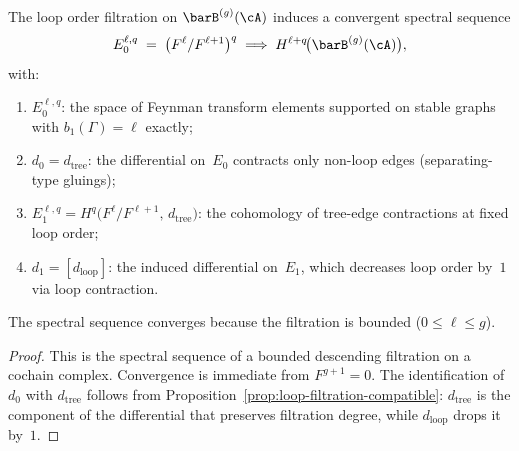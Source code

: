 \begin{theorem}\label{thm:loop-order-spectral-sequence}
The loop order filtration on $\barB^{(g)}(\cA)$ induces a
convergent spectral sequence
\begin{equation}\label{eq:loop-ss}
E_0^{\ell,q}
\;=\;
\bigl(F^\ell / F^{\ell+1}\bigr)^q
\;\Longrightarrow\;
H^{\ell+q}\!\bigl(\barB^{(g)}(\cA)\bigr),
\end{equation}
with:
\begin{enumerate}[label=\textup{(\roman*)}]
\item $E_0^{\ell,q}$: the space of Feynman transform elements
 supported on stable graphs with $b_1(\Gamma) = \ell$ exactly;

\item $d_0 = d_{\mathrm{tree}}$: the differential on~$E_0$ contracts
 only non-loop edges \textup{(}separating-type gluings\textup{)};

\item $E_1^{\ell,q}
 = H^q\!\bigl(F^\ell / F^{\ell+1},\, d_{\mathrm{tree}}\bigr)$:
 the cohomology of tree-edge contractions at fixed loop order;

\item $d_1 = [d_{\mathrm{loop}}]$:
 the induced differential on~$E_1$, which decreases loop
 order by~$1$ via loop contraction.
\end{enumerate}
The spectral sequence converges because the filtration is
bounded \textup{(}$0 \leq \ell \leq g$\textup{)}.
\end{theorem}

\begin{proof}
This is the spectral sequence of a bounded descending filtration
on a cochain complex. Convergence is immediate from
$F^{g+1} = 0$. The identification of $d_0$ with
$d_{\mathrm{tree}}$ follows from
Proposition~\ref{prop:loop-filtration-compatible}: $d_{\mathrm{tree}}$
is the component of the differential that preserves filtration degree,
while $d_{\mathrm{loop}}$ drops it by~$1$.
\end{proof}

